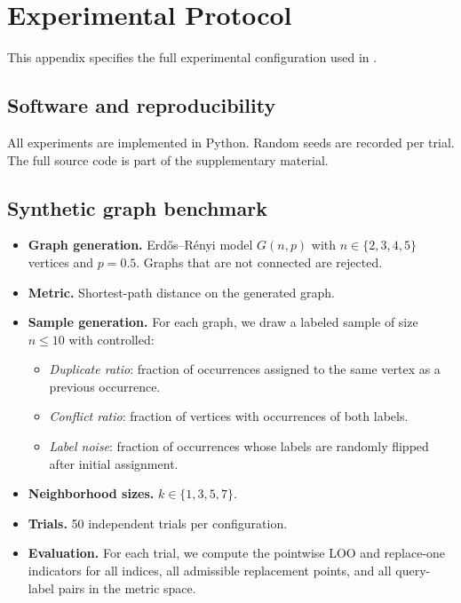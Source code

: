 \section{Experimental Protocol}
\label{app:experimental-protocol}

This appendix specifies the full experimental configuration used in
.

\subsection{Software and reproducibility}

All experiments are implemented in Python.  Random seeds are recorded per trial.
The full source code is part of the supplementary material.

\subsection{Synthetic graph benchmark}

\begin{itemize}
\item \textbf{Graph generation.}  Erd\H{o}s--R\'enyi model $G(n,p)$ with
    $n \in \{2,3,4,5\}$ vertices and $p = 0.5$.  Graphs that are not connected
    are rejected.
\item \textbf{Metric.}  Shortest-path distance on the generated graph.
\item \textbf{Sample generation.}  For each graph, we draw a labeled sample of
    size $n \le 10$ with controlled:
    \begin{itemize}
        \item \emph{Duplicate ratio}: fraction of occurrences assigned to the
            same vertex as a previous occurrence.
        \item \emph{Conflict ratio}: fraction of vertices with occurrences of
            both labels.
        \item \emph{Label noise}: fraction of occurrences whose labels are
            randomly flipped after initial assignment.
    \end{itemize}
\item \textbf{Neighborhood sizes.}  $k \in \{1,3,5,7\}$.
\item \textbf{Trials.}  50 independent trials per configuration.
\item \textbf{Evaluation.}  For each trial, we compute the pointwise LOO and
    replace-one indicators for all indices, all admissible replacement points,
    and all query-label pairs in the metric space.
\end{itemize}

